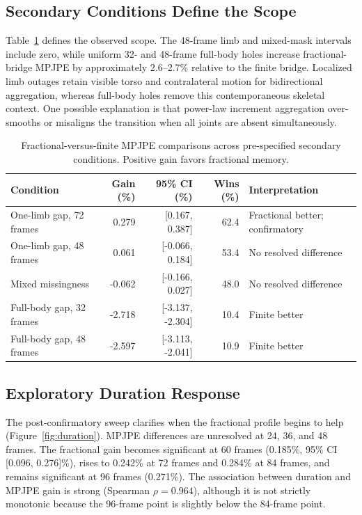 \documentclass[fractalfract,article,submit,moreauthors,pdftex]{Definitions/mdpi}
\begin{document}
\subsection{Secondary Conditions Define the Scope}

Table~\ref{tab:scope} defines the observed scope. The 48-frame limb and mixed-mask intervals include zero, while uniform 32- and 48-frame full-body holes increase fractional-bridge MPJPE by approximately 2.6--2.7\% relative to the finite bridge. Localized limb outages retain visible torso and contralateral motion for bidirectional aggregation, whereas full-body holes remove this contemporaneous skeletal context. One possible explanation is that power-law increment aggregation over-smooths or misaligns the transition when all joints are absent simultaneously.

\begin{table}[H]
\caption{Fractional-versus-finite MPJPE comparisons across pre-specified secondary conditions. Positive gain favors fractional memory.\label{tab:scope}}
\begin{tabularx}{\textwidth}{lrrr>{\raggedright\arraybackslash}X}
\toprule
\textbf{Condition} & \textbf{Gain (\%)} & \textbf{95\% CI (\%)} & \textbf{Wins (\%)} & \textbf{Interpretation}\\
\midrule
One-limb gap, 72 frames & 0.279 & [0.167, 0.387] & 62.4 & Fractional better; confirmatory\\
One-limb gap, 48 frames & 0.061 & [-0.066, 0.184] & 53.4 & No resolved difference\\
Mixed missingness & -0.062 & [-0.166, 0.027] & 48.0 & No resolved difference\\
Full-body gap, 32 frames & -2.718 & [-3.137, -2.304] & 10.4 & Finite better\\
Full-body gap, 48 frames & -2.597 & [-3.113, -2.041] & 10.9 & Finite better\\
\bottomrule
\end{tabularx}
\end{table}

\subsection{Exploratory Duration Response}

The post-confirmatory sweep clarifies when the fractional profile begins to help (Figure~\ref{fig:duration}). MPJPE differences are unresolved at 24, 36, and 48 frames. The fractional gain becomes significant at 60 frames (0.185\%, 95\% CI [0.096, 0.276]\%), rises to 0.242\% at 72 frames and 0.284\% at 84 frames, and remains significant at 96 frames (0.271\%). The association between duration and MPJPE gain is strong (Spearman $\rho=0.964$), although it is not strictly monotonic because the 96-frame point is slightly below the 84-frame point.
\end{document}
